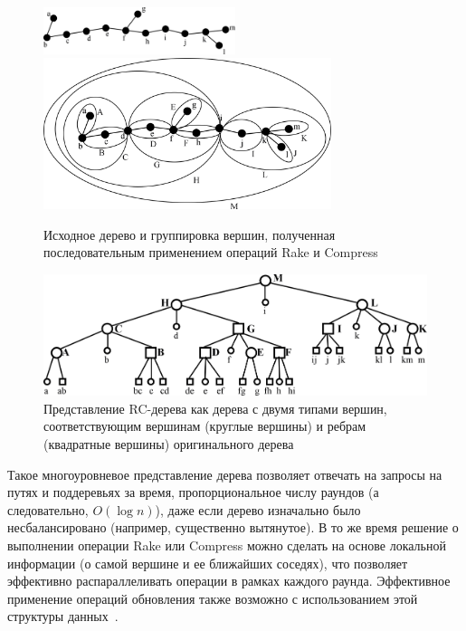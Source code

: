 \documentclass[specification,annotation]{itmo-student-thesis}
\begin{document}
\begin{figure}[!ht]
\centering
\includegraphics[width=0.5\textwidth]{pic/rc_tree_1_primitive_tree.png}\\
\includegraphics[width=0.75\textwidth]{pic/rc_tree_2_completed_clustering.png}
\caption{Исходное дерево и группировка вершин, полученная последовательным применением операций Rake и Compress}\label{fig:rctree-overall}
\end{figure}

\begin{figure}[!ht]
\centering
\includegraphics[width=\textwidth]{pic/rc_tree_4_two_types.png}
\caption{Представление RC-дерева как дерева с двумя типами вершин, соответствующим вершинам (круглые вершины) и ребрам (квадратные вершины) оригинального дерева}\label{fig:rctree-two-types}
\end{figure}

Такое многоуровневое представление дерева позволяет отвечать на запросы на путях и поддеревьях за время, пропорциональное числу раундов (а следовательно, $O(\log n)$),
даже если дерево изначально было несбалансировано (например, существенно вытянутое). В то же время решение о выполнении операции Rake или Compress можно сделать на основе локальной информации (о самой
вершине и ее ближайших соседях), что позволяет эффективно распараллеливать операции в рамках каждого раунда.
Эффективное применение операций обновления также возможно с использованием этой структуры данных~\cite{acar04}.
\end{document}
